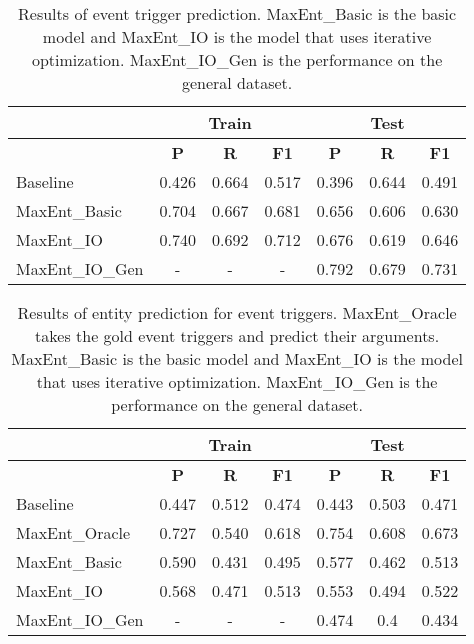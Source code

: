 \begin{table*}[ht]
\centering
\begin{tabular}{|l||c|c|c||c|c|c||} \hline
& \multicolumn{3}{|c||}{\textbf{Train}} & \multicolumn{3}{|c||}{\textbf{Test}}\\ \hline
&\textbf{P} & \textbf{R} & \textbf{F1} &\textbf{P} & \textbf{R} & \textbf{F1}\\ \hline
Baseline&0.426 & 0.664 &0.517&0.396 & 0.644 &0.491\\
MaxEnt\_Basic& 0.704 & 0.667&  0.681&0.656 & 0.606 &0.630 \\
MaxEnt\_IO&0.740&0.692&0.712&0.676 & 0.619 &0.646\\
MaxEnt\_IO\_Gen&- & - &-&0.792& 0.679 &0.731\\
\hline
\end{tabular}
\caption{Results of event trigger prediction. MaxEnt\_Basic is the basic model and MaxEnt\_IO is the model that uses iterative optimization. MaxEnt\_IO\_Gen is the performance on the general dataset.}
\label{table:eventprediction}
\end{table*}

\begin{table*}[ht]
\centering
\begin{tabular}{|l||c|c|c||c|c|c||} \hline
& \multicolumn{3}{|c||}{\textbf{Train}} & \multicolumn{3}{|c||}{\textbf{Test}}\\ \hline
&\textbf{P} & \textbf{R} & \textbf{F1} &\textbf{P} & \textbf{R} & \textbf{F1}\\ \hline
Baseline&0.447 & 0.512 &0.474& 0.443 & 0.503 &0.471\\
MaxEnt\_Oracle&  0.727 & 0.540 &0.618&0.754 & 0.608 &0.673\\
MaxEnt\_Basic& 0.590 & 0.431 &0.495&0.577 & 0.462 &0.513\\
MaxEnt\_IO& 0.568 & 0.471 &0.513&0.553 & 0.494 &0.522\\
MaxEnt\_IO\_Gen&- & - &-&0.474& 0.4 &0.434\\
\hline
\end{tabular}
\caption{Results of entity prediction for event triggers. MaxEnt\_Oracle takes the gold event triggers and predict their arguments. MaxEnt\_Basic is the basic model and MaxEnt\_IO is the model that uses iterative optimization. MaxEnt\_IO\_Gen is the performance on the general dataset.}
\label{table:entityprediction}
\end{table*}

